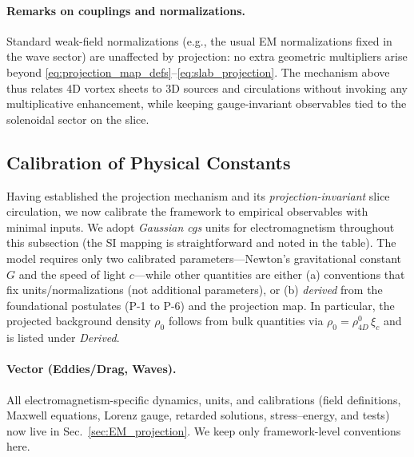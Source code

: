 \paragraph{Remarks on couplings and normalizations.}
Standard weak-field normalizations (e.g., the usual EM normalizations fixed in the wave sector) are unaffected by projection: no extra geometric multipliers arise beyond \eqref{eq:projection_map_defs}–\eqref{eq:slab_projection}. The mechanism above thus relates $4$D vortex sheets to $3$D sources and circulations without invoking any multiplicative enhancement, while keeping gauge-invariant observables tied to the solenoidal sector on the slice.

\subsection{Calibration of Physical Constants}

Having established the projection mechanism and its \emph{projection-invariant} slice circulation, we now calibrate the framework to empirical observables with minimal inputs. We adopt \emph{Gaussian cgs} units for electromagnetism throughout this subsection (the SI mapping is straightforward and noted in the table). The model requires only two calibrated parameters---Newton's gravitational constant $G$ and the speed of light $c$---while other quantities are either (a) conventions that fix units/normalizations (not additional parameters), or (b) \emph{derived} from the foundational postulates (P-1 to P-6) and the projection map. In particular, the projected background density $\rho_0$ follows from bulk quantities via $\rho_0=\rho_{4D}^0\,\xi_c$ and is listed under \emph{Derived}.

\paragraph{Vector (Eddies/Drag, Waves).}
All electromagnetism-specific dynamics, units, and calibrations (field definitions, Maxwell equations, Lorenz gauge, retarded solutions, stress–energy, and tests) now live in Sec.~\ref{sec:EM_projection}. We keep only framework-level conventions here.

\medskip

